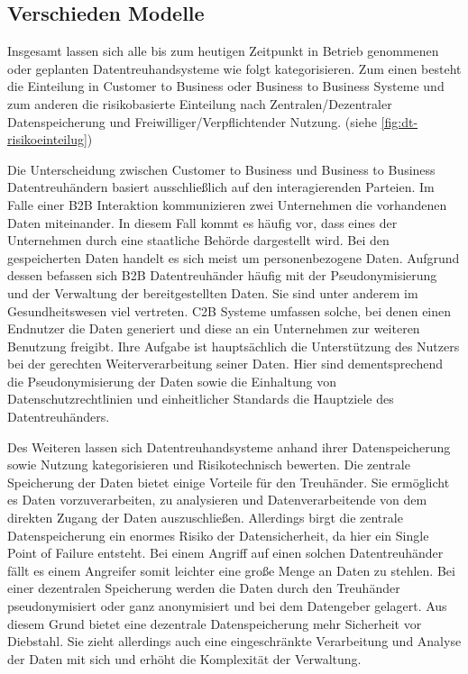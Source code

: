 \documentclass[11pt,a4paper]{scrreprt}
\begin{document}
\subsection{Verschieden Modelle}
Insgesamt lassen sich alle bis zum heutigen Zeitpunkt in Betrieb genommenen oder geplanten Datentreuhandsysteme wie folgt kategorisieren. Zum einen besteht die Einteilung in Customer to Business oder Business to Business Systeme und zum anderen die risikobasierte Einteilung nach Zentralen/Dezentraler Datenspeicherung und Freiwilliger/Verpflichtender Nutzung. (siehe \ref{fig:dt-risikoeinteilug})

Die Unterscheidung zwischen Customer to Business und Business to Business Datentreuhändern basiert ausschließlich auf den interagierenden Parteien. Im Falle einer B2B Interaktion kommunizieren zwei Unternehmen die vorhandenen Daten miteinander. In diesem Fall kommt es häufig vor, dass eines der Unternehmen durch eine staatliche Behörde dargestellt wird. Bei den gespeicherten Daten handelt es sich meist um personenbezogene Daten. Aufgrund dessen befassen sich B2B Datentreuhänder häufig mit der Pseudonymisierung und der Verwaltung der bereitgestellten Daten. Sie sind unter anderem im Gesundheitswesen viel vertreten. \cite{dt-blankertz2020datentreuhandmodelle}
C2B Systeme umfassen solche, bei denen einen Endnutzer die Daten generiert und diese an ein Unternehmen zur weiteren Benutzung freigibt. Ihre Aufgabe ist hauptsächlich die Unterstützung des Nutzers bei der gerechten Weiterverarbeitung seiner Daten. \cite{dt-blankertz2020datentreuhandmodelle} Hier sind dementsprechend die Pseudonymisierung der Daten sowie die Einhaltung von Datenschutzrechtlinien und einheitlicher Standards die Hauptziele des Datentreuhänders.

Des Weiteren lassen sich Datentreuhandsysteme anhand ihrer Datenspeicherung sowie Nutzung kategorisieren und Risikotechnisch bewerten. Die zentrale Speicherung der Daten bietet einige Vorteile für den Treuhänder. Sie ermöglicht es Daten vorzuverarbeiten, zu analysieren und Datenverarbeitende von dem direkten Zugang der Daten auszuschließen. Allerdings birgt die zentrale Datenspeicherung ein enormes Risiko der Datensicherheit, da hier ein Single Point of Failure entsteht. Bei einem Angriff auf einen solchen Datentreuhänder fällt es einem Angreifer somit leichter eine große Menge an Daten zu stehlen.
Bei einer dezentralen Speicherung werden die Daten durch den Treuhänder pseudonymisiert oder ganz anonymisiert und bei dem Datengeber gelagert. Aus diesem Grund bietet eine dezentrale Datenspeicherung mehr Sicherheit vor Diebstahl. Sie zieht allerdings auch eine eingeschränkte Verarbeitung und Analyse der Daten mit sich und erhöht die Komplexität der Verwaltung.\\
\end{document}
